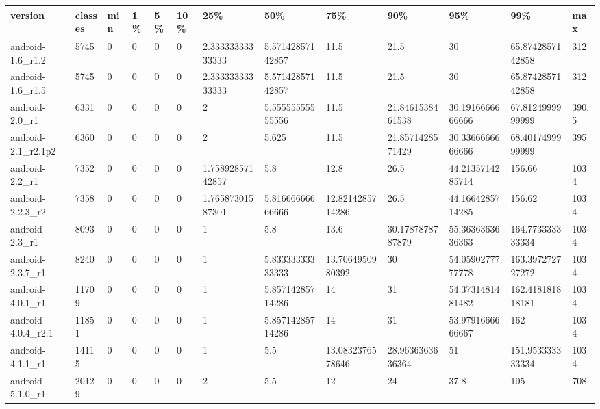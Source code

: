 \begin{tabular}{|l|l|l|l|l|l|l|l|l|l|l|l|l|}
\hline
version&classes&min&1\%&5\%&10\%&25\%&50\%&75\%&90\%&95\%&99\%&max\\
\hline
android-1.6\_r1.2&5745&0&0&0&0&2.33333333333333&5.57142857142857&11.5&21.5&30&65.8742857142858&312\\
\hline
android-1.6\_r1.5&5745&0&0&0&0&2.33333333333333&5.57142857142857&11.5&21.5&30&65.8742857142858&312\\
\hline
android-2.0\_r1&6331&0&0&0&0&2&5.55555555555556&11.5&21.8461538461538&30.1916666666666&67.8124999999999&390.5\\
\hline
android-2.1\_r2.1p2&6360&0&0&0&0&2&5.625&11.5&21.8571428571429&30.3366666666666&68.4017499999999&395\\
\hline
android-2.2\_r1&7352&0&0&0&0&1.75892857142857&5.8&12.8&26.5&44.2135714285714&156.66&1034\\
\hline
android-2.2.3\_r2&7358&0&0&0&0&1.76587301587301&5.81666666666666&12.8214285714286&26.5&44.1664285714285&156.62&1034\\
\hline
android-2.3\_r1&8093&0&0&0&0&1&5.8&13.6&30.1787878787879&55.3636363636363&164.773333333334&1034\\
\hline
android-2.3.7\_r1&8240&0&0&0&0&1&5.83333333333333&13.7064950980392&30&54.0590277777778&163.397272727272&1034\\
\hline
android-4.0.1\_r1&11709&0&0&0&0&1&5.85714285714286&14&31&54.3731481481482&162.418181818181&1034\\
\hline
android-4.0.4\_r2.1&11851&0&0&0&0&1&5.85714285714286&14&31&53.9791666666667&162&1034\\
\hline
android-4.1.1\_r1&14115&0&0&0&0&1&5.5&13.0832376578646&28.9636363636364&51&151.953333333334&1034\\
\hline
android-5.1.0\_r1&20129&0&0&0&0&2&5.5&12&24&37.8&105&708\\
\hline
\end{tabular}
